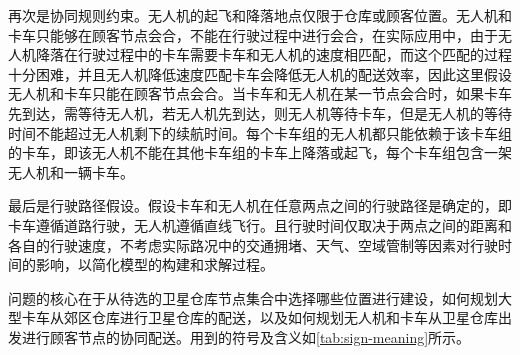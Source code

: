 \documentclass[fontset=none]{ctexart}
\begin{document}
再次是协同规则约束。无人机的起飞和降落地点仅限于仓库或顾客位置。无人机和卡车只能够在顾客节点会合，不能在行驶过程中进行会合，在实际应用中，由于无人机降落在行驶过程中的卡车需要卡车和无人机的速度相匹配，而这个匹配的过程十分困难\cite{buchmueller2016landing}，并且无人机降低速度匹配卡车会降低无人机的配送效率，因此这里假设无人机和卡车只能在顾客节点会合。当卡车和无人机在某一节点会合时，如果卡车先到达，需等待无人机，若无人机先到达，则无人机等待卡车，但是无人机的等待时间不能超过无人机剩下的续航时间。每个卡车组的无人机都只能依赖于该卡车组的卡车，即该无人机不能在其他卡车组的卡车上降落或起飞，每个卡车组包含一架无人机和一辆卡车。

最后是行驶路径假设。假设卡车和无人机在任意两点之间的行驶路径是确定的，即卡车遵循道路行驶，无人机遵循直线飞行。且行驶时间仅取决于两点之间的距离和各自的行驶速度，不考虑实际路况中的交通拥堵、天气、空域管制等因素对行驶时间的影响，以简化模型的构建和求解过程。

问题的核心在于从待选的卫星仓库节点集合中选择哪些位置进行建设，如何规划大型卡车从郊区仓库进行卫星仓库的配送，以及如何规划无人机和卡车从卫星仓库出发进行顾客节点的协同配送。用到的符号及含义如\cref{tab:sign-meaning}所示。
\end{document}
